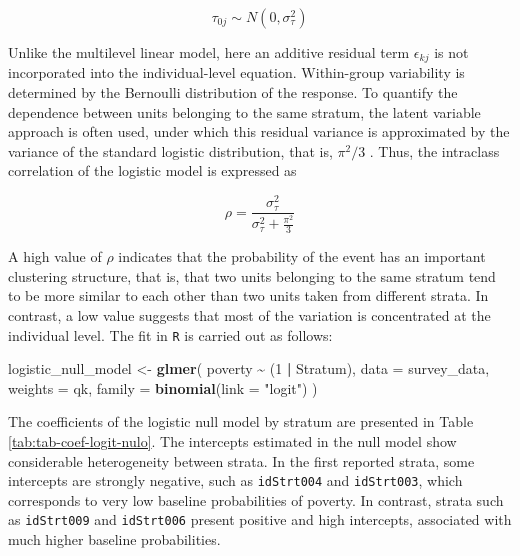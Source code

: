 \documentclass[
  english,
  12pt,
]{book}
\newenvironment{Shaded}{\begin{snugshade}}{\end{snugshade}}
\newcommand{\AttributeTok}[1]{\textcolor[rgb]{0.13,0.29,0.53}{#1}}
\newcommand{\DataTypeTok}[1]{\textcolor[rgb]{0.13,0.29,0.53}{#1}}
\newcommand{\DecValTok}[1]{\textcolor[rgb]{0.00,0.00,0.81}{#1}}
\newcommand{\FunctionTok}[1]{\textcolor[rgb]{0.13,0.29,0.53}{\textbf{#1}}}
\newcommand{\NormalTok}[1]{#1}
\newcommand{\OtherTok}[1]{\textcolor[rgb]{0.56,0.35,0.01}{#1}}
\newcommand{\SpecialCharTok}[1]{\textcolor[rgb]{0.81,0.36,0.00}{\textbf{#1}}}
\newcommand{\StringTok}[1]{\textcolor[rgb]{0.31,0.60,0.02}{#1}}
\begin{document}
\[
\tau_{0j} \sim N(0,\sigma_{\tau}^{2})
\]

Unlike the multilevel linear model, here an additive residual term \(\epsilon_{kj}\) is not incorporated into the individual-level equation. Within-group variability is determined by the Bernoulli distribution of the response. To quantify the dependence between units belonging to the same stratum, the latent variable approach is often used, under which this residual variance is approximated by the variance of the standard logistic distribution, that is, \(\pi^2/3\) \citep{snijders2011}. Thus, the intraclass correlation of the logistic model is expressed as

\[
\rho =
\frac{\sigma_\tau^2}
{\sigma_\tau^2 + \frac{\pi^2}{3}}
\]

A high value of \(\rho\) indicates that the probability of the event has an important clustering structure, that is, that two units belonging to the same stratum tend to be more similar to each other than two units taken from different strata. In contrast, a low value suggests that most of the variation is concentrated at the individual level. The fit in \texttt{R} is carried out as follows:

\begin{Shaded}
\begin{Highlighting}[]
\NormalTok{logistic\_null\_model }\OtherTok{\textless{}{-}} \FunctionTok{glmer}\NormalTok{(}
\NormalTok{  poverty }\SpecialCharTok{\textasciitilde{}}\NormalTok{ (}\DecValTok{1} \SpecialCharTok{|}\NormalTok{ Stratum),}
  \AttributeTok{data =}\NormalTok{ survey\_data,}
  \AttributeTok{weights =}\NormalTok{ qk,}
  \AttributeTok{family =} \FunctionTok{binomial}\NormalTok{(}\AttributeTok{link =} \StringTok{"logit"}\NormalTok{)}
\NormalTok{)}
\end{Highlighting}
\end{Shaded}

The coefficients of the logistic null model by stratum are presented in Table \ref{tab:tab-coef-logit-nulo}. The intercepts estimated in the null model show considerable heterogeneity between strata. In the first reported strata, some intercepts are strongly negative, such as \texttt{idStrt004} and \texttt{idStrt003}, which corresponds to very low baseline probabilities of poverty. In contrast, strata such as \texttt{idStrt009} and \texttt{idStrt006} present positive and high intercepts, associated with much higher baseline probabilities.

\begin{Shaded}
\end{Shaded}
\end{document}
